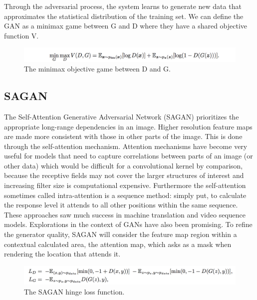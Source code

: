 \documentclass[10pt,twocolumn,letterpaper]{article}
\begin{document}
Through the adversarial process, the system learns
to generate new data that approximates the statistical distribution of the
training set. We can define the GAN as a minimax game between G and D where they
have a shared objective function V.

\begin{figure}
  \includegraphics[width=1.1\linewidth]{images/gan_objective.png}
  \caption{The minimax objective game between D and G.}
  \label{fig:gan_objective}
\end{figure}

\subsection{SAGAN}

The Self-Attention Generative Adversarial Network (SAGAN) prioritizes the
appropriate long-range dependencies in an image. Higher resolution feature
maps are made more consistent with those in other parts of the image.
This is done through the self-attention mechanism. Attention mechanisms
have become very useful for models that need to capture correlations
between parts of an image (or other data) which would be difficult for
a convolutional kernel by comparison, because the receptive fields may not
cover the larger structures of interest and increasing filter size is computational
expensive. Furthermore the self-attention sometimes called intra-attention is a sequence method:
simply put, to calculate the response level it attends to all other positions
within the same sequence. These approaches saw much success in machine translation
and video sequence models. Explorations in the context of GANs have also been
promising. To refine the generator quality, SAGAN will consider the feature map
region within a contextual calculated area, the attention map, which asks as a mask
when rendering the location that attends it.

\begin{figure}
  \includegraphics[width=1.1\linewidth]{images/sagan_hingeloss.png}
  \caption{The SAGAN hinge loss function.}
  \label{fig:sagan_hingeloss}
\end{figure}
\end{document}
